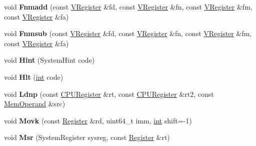 \begin{DoxyCompactItemize}
void {\bfseries Fnmadd} (const \mbox{\hyperlink{classv8_1_1internal_1_1VRegister}{V\+Register}} \&fd, const \mbox{\hyperlink{classv8_1_1internal_1_1VRegister}{V\+Register}} \&fn, const \mbox{\hyperlink{classv8_1_1internal_1_1VRegister}{V\+Register}} \&fm, const \mbox{\hyperlink{classv8_1_1internal_1_1VRegister}{V\+Register}} \&fa)
\item 
\mbox{\label{classv8_1_1internal_1_1MacroAssembler_aa88cd486a5213b79d3acfa8e13e5b208}} 
void {\bfseries Fnmsub} (const \mbox{\hyperlink{classv8_1_1internal_1_1VRegister}{V\+Register}} \&fd, const \mbox{\hyperlink{classv8_1_1internal_1_1VRegister}{V\+Register}} \&fn, const \mbox{\hyperlink{classv8_1_1internal_1_1VRegister}{V\+Register}} \&fm, const \mbox{\hyperlink{classv8_1_1internal_1_1VRegister}{V\+Register}} \&fa)
\item 
\mbox{\label{classv8_1_1internal_1_1MacroAssembler_a507cd3e417dccd8fa97e84c3ee715073}} 
void {\bfseries Hint} (System\+Hint code)
\item 
\mbox{\label{classv8_1_1internal_1_1MacroAssembler_ab04b3c1d0dad81134e2238a84c73c738}} 
void {\bfseries Hlt} (\mbox{\hyperlink{classint}{int}} code)
\item 
\mbox{\label{classv8_1_1internal_1_1MacroAssembler_a4bc15d4322ffcb5bd95e144a6920f1c6}} 
void {\bfseries Ldnp} (const \mbox{\hyperlink{classv8_1_1internal_1_1CPURegister}{C\+P\+U\+Register}} \&rt, const \mbox{\hyperlink{classv8_1_1internal_1_1CPURegister}{C\+P\+U\+Register}} \&rt2, const \mbox{\hyperlink{classv8_1_1internal_1_1MemOperand}{Mem\+Operand}} \&src)
\item 
\mbox{\label{classv8_1_1internal_1_1MacroAssembler_af867ccc8a9b53b774989e07c625a279f}} 
void {\bfseries Movk} (const \mbox{\hyperlink{classv8_1_1internal_1_1Register}{Register}} \&rd, uint64\+\_\+t imm, \mbox{\hyperlink{classint}{int}} shift=-\/1)
\item 
\mbox{\label{classv8_1_1internal_1_1MacroAssembler_a3ed623e250ea8c9c0d2e1d568553b39c}} 
void {\bfseries Msr} (System\+Register sysreg, const \mbox{\hyperlink{classv8_1_1internal_1_1Register}{Register}} \&rt)

\end{DoxyCompactItemize}
